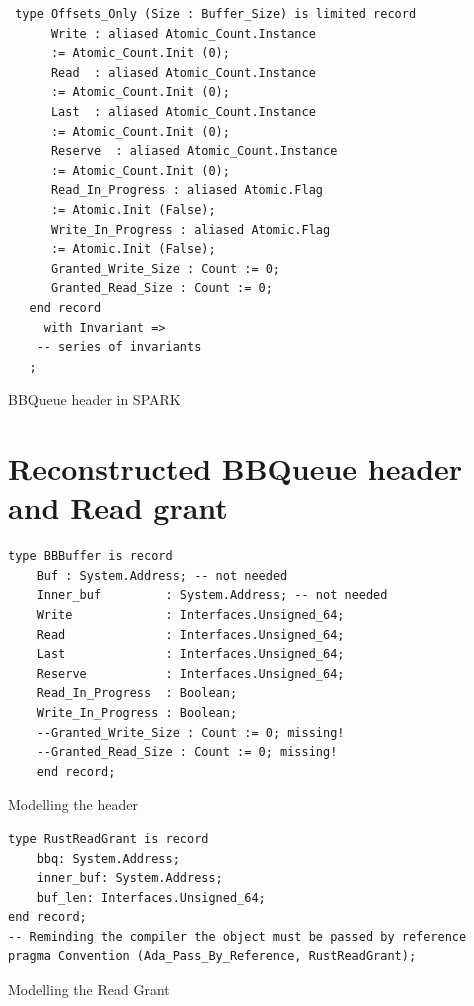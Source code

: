 \documentclass[nomenclature, english, bibtex]{kththesis}
\begin{document}
{\begin{listing}[!ht]
\begin{verbatim}
 type Offsets_Only (Size : Buffer_Size) is limited record
      Write : aliased Atomic_Count.Instance 
      := Atomic_Count.Init (0);
      Read  : aliased Atomic_Count.Instance 
      := Atomic_Count.Init (0);
      Last  : aliased Atomic_Count.Instance 
      := Atomic_Count.Init (0);
      Reserve  : aliased Atomic_Count.Instance 
      := Atomic_Count.Init (0);
      Read_In_Progress : aliased Atomic.Flag 
      := Atomic.Init (False);
      Write_In_Progress : aliased Atomic.Flag 
      := Atomic.Init (False);
      Granted_Write_Size : Count := 0;
      Granted_Read_Size : Count := 0;
   end record
     with Invariant =>
    -- series of invariants
   ;
\end{verbatim}
\caption[BBQueue header in SPARK]{BBQueue header in SPARK}
\label{lst:SPARK_bbqueue_header}
\end{listing}
\FloatBarrier

\section{Reconstructed BBQueue header and Read grant}
\begin{listing}[ht!]
\begin{verbatim}
type BBBuffer is record
    Buf : System.Address; -- not needed
    Inner_buf         : System.Address; -- not needed
    Write             : Interfaces.Unsigned_64;
    Read              : Interfaces.Unsigned_64;
    Last              : Interfaces.Unsigned_64;
    Reserve           : Interfaces.Unsigned_64;
    Read_In_Progress  : Boolean;
    Write_In_Progress : Boolean;
    --Granted_Write_Size : Count := 0; missing!
    --Granted_Read_Size : Count := 0; missing!
    end record;
\end{verbatim}
\caption{Modelling the header}
\label{lst:bbqueueheaderinspark}
\end{listing}
\FloatBarrier


\begin{listing}[ht!]
\begin{verbatim}
type RustReadGrant is record
    bbq: System.Address;
    inner_buf: System.Address;
    buf_len: Interfaces.Unsigned_64;
end record;
-- Reminding the compiler the object must be passed by reference
pragma Convention (Ada_Pass_By_Reference, RustReadGrant);
\end{verbatim}
\caption{Modelling the Read Grant}
\label{lst:bbqueuereadgrantinspark}
\end{listing}
\FloatBarrier
\cleardoublepage


}
\end{document}
